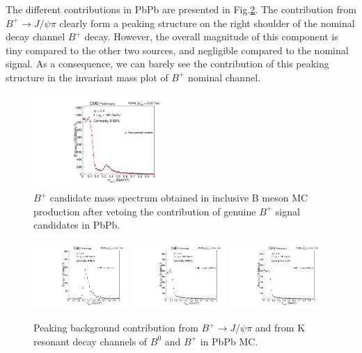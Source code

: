 The different contributions in PbPb are presented in Fig.\ref{BPNPPeak}.
The contribution from $B^+\rightarrow J/\psi \pi$ clearly form a peaking structure on the right shoulder of the nominal decay channel $B^+$ decay. However, the overall magnitude of this component is tiny compared to the other two sources, and negligible compared to the nominal signal. As a consequence, we can barely see the contribution of this peaking structure in the invariant mass plot of $B^+$ nominal channel.

\begin{figure}[h]
\begin{center}
\includegraphics[width= 0.45\textwidth]{Figures/Chapter5/fitNP_PbPb.pdf}
\caption{$B^+$ candidate mass spectrum obtained in inclusive B meson MC production after vetoing the contribution of genuine $B^+$ signal candidates in PbPb.}
\label{NPBP}
\end{center}
\end{figure}

\begin{figure}[h]
\begin{center}
\includegraphics[width= 0.32\textwidth]{Figures/Chapter5/BmassBpPi.pdf}
\includegraphics[width= 0.32\textwidth]{Figures/Chapter5/BmassBpK_tkmatch.pdf}
\includegraphics[width= 0.32\textwidth]{Figures/Chapter5/BmassB0K_tkmatch.pdf}
\caption{Peaking background contribution from $B^+\rightarrow J/\psi \pi$ and from K resonant decay channels of $B^0$ and $B^+$ in PbPb MC.}
\label{BPNPPeak}
\end{center}
\end{figure}

